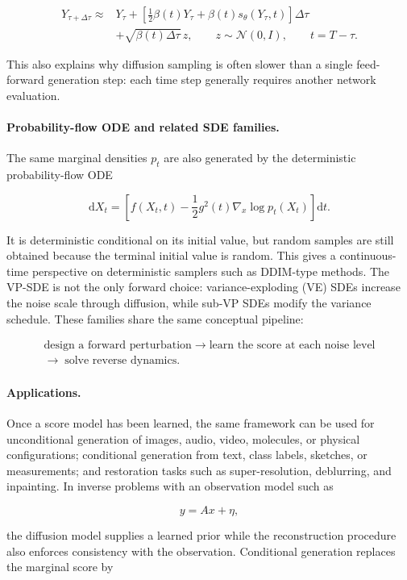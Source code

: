\documentclass[11pt,a4paper]{article}
\theoremstyle{definition}
\begin{document}
\[
\begin{aligned}
Y_{\tau+\Delta\tau}
\approx{}&Y_\tau+
\left[
\frac12\beta(t)Y_\tau+\beta(t)s_\theta(Y_\tau,t)
\right]\Delta\tau \\
&+\sqrt{\beta(t)\Delta\tau}\,z,
\qquad
z\sim\mathcal{N}(0,I),
\qquad
t=T-\tau.
\end{aligned}
\]

This also explains why diffusion sampling is often slower than a single feed-forward
generation step: each time step generally requires another network evaluation.

\paragraph{Probability-flow ODE and related SDE families.}
The same marginal densities $p_t$ are also generated by the deterministic probability-flow
ODE

\[
\mathrm{d}X_t
=\left[f(X_t,t)-\frac12g^2(t)\nabla_x\log p_t(X_t)\right]\mathrm{d}t.
\]

It is deterministic conditional on its initial value, but random samples are still obtained
because the terminal initial value is random. This gives a continuous-time perspective on
deterministic samplers such as DDIM-type methods. The VP-SDE is not the only forward
choice: variance-exploding (VE) SDEs increase the noise scale through diffusion, while
sub-VP SDEs modify the variance schedule. These families share the same conceptual
pipeline:

\[
\begin{gathered}
\text{design a forward perturbation}
\;\longrightarrow\;
\text{learn the score at each noise level} \\
\longrightarrow\;
\text{solve reverse dynamics}.
\end{gathered}
\]

\paragraph{Applications.}
Once a score model has been learned, the same framework can be used for unconditional
generation of images, audio, video, molecules, or physical configurations; conditional
generation from text, class labels, sketches, or measurements; and restoration tasks such
as super-resolution, deblurring, and inpainting. In inverse problems with an observation
model such as

\[
y=Ax+\eta,
\]

the diffusion model supplies a learned prior while the reconstruction procedure also
enforces consistency with the observation. Conditional generation replaces the marginal
score by
\end{document}
